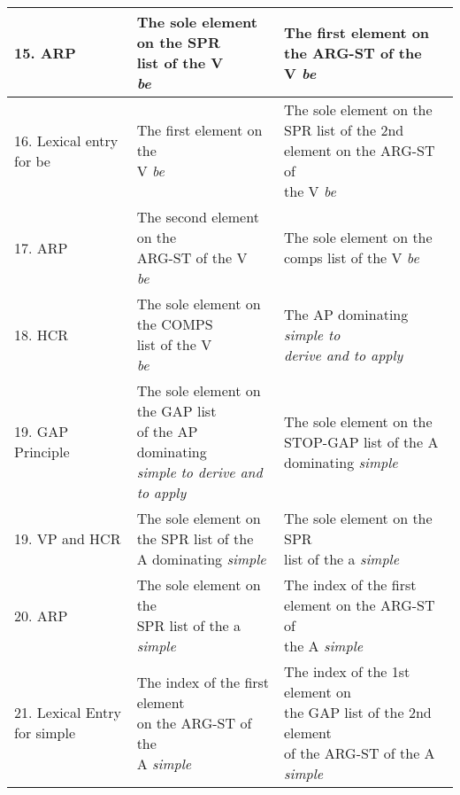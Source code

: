 \documentclass[12pt]{article}
\begin{document}
\begin{tiny}
\begin{footnotesize}
\begin{longtable}{|l|l|l|}
15. ARP &  \makecell{The sole element on the SPR\\ list of the V\\ {\it be}} &  \makecell{The first element on \\ the ARG-ST of the \\ V {\it be}} \\ \hline
16. Lexical entry for be &  \makecell{The first element on the \\V {\it be}} &  \makecell{The sole element on the\\ SPR list of the 2nd \\element on the ARG-ST of \\the V {\it be} } \\ \hline
17. ARP &  \makecell{The second element on the \\ ARG-ST of the V \\{\it be}} &  \makecell{The sole element on the \\ comps list of the V {\it be}} \\ \hline
18. HCR &  \makecell{The sole element on the COMPS \\ list of the V \\{\it be}} &  \makecell{The AP dominating \\ {\it simple to} \\{\it derive and to apply}}  \\ \hline
19. GAP Principle & \makecell{The sole element on the GAP list \\ of the AP dominating\\ {\it simple to derive and to apply}} & \makecell{The sole element on the \\ STOP-GAP list of the A dominating {\it simple}} \\ \hline
19. VP and HCR &  \makecell{The sole element on  \\ the SPR list of the \\ A dominating {\it simple}} &  \makecell{The sole element on the SPR\\ list of the a {\it simple}} \\ \hline
20. ARP & \makecell{The sole element on the \\ SPR list of the a\\ {\it simple}} & \makecell{The index of the first \\element on the ARG-ST of \\the A {\it simple}}  \\ \hline
21. Lexical Entry for simple & \makecell{The index of the first element\\ on the ARG-ST of the \\ A {\it simple}} & \makecell{The index of the 1st element on \\ the GAP list of the 2nd element \\ of the ARG-ST of the A {\it simple}} \\ \hline

\end{longtable}
\end{footnotesize}
\end{tiny}
\end{document}
